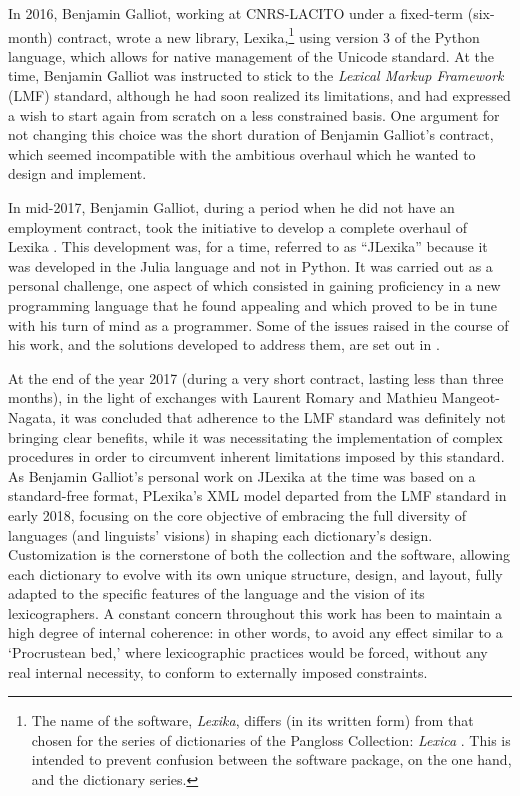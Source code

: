 In 2016, Benjamin Galliot, working at CNRS-LACITO under a fixed-term (six-month) contract, wrote a new library, Lexika,\footnote{The name of the software, \emph{Lexika}, differs (in its written form) from that chosen for the series of dictionaries of the Pangloss Collection: \emph{Lexica} \parencite{lexica2017}. This is intended to prevent confusion between the software package, on the one hand, and the dictionary series.} using version 3 of the Python language, which allows for native management of the Unicode standard. At the time, Benjamin Galliot was instructed to stick to the \emph{Lexical Markup Framework} (LMF) standard, although he had soon realized its limitations, and had expressed a wish to start again from scratch on a less constrained basis. One argument for not changing this choice was the short duration of Benjamin Galliot's contract, which seemed incompatible with the ambitious overhaul which he wanted to design and implement.

In mid-2017, Benjamin Galliot, during a period when he did not have an employment contract, took the initiative to develop a complete overhaul of Lexika \parencite{galliot:2017:lexika}. This development was, for a time, referred to as “JLexika” because it was developed in the Julia language and not in Python. It was carried out as a personal challenge, one aspect of which consisted in gaining proficiency in a new programming language that he found appealing and which proved to be in tune with his turn of mind as a programmer. Some of the issues raised in the course of his work, and the solutions developed to address them, are set out in \cite{galliot:2023:lexikaproblématiques}.

At the end of the year 2017 (during a very short contract, lasting less than three months), in the light of exchanges with Laurent Romary and Mathieu Mangeot-Nagata, it was concluded that adherence to the LMF standard was definitely not bringing clear benefits, while it was necessitating the implementation of complex procedures in order to circumvent inherent limitations imposed by this standard. As Benjamin Galliot's personal work on JLexika at the time was based on a standard-free format, PLexika's XML model departed from the LMF standard in early 2018, focusing on the core objective of embracing the full diversity of languages (and linguists' visions) in shaping each dictionary’s design. Customization is the cornerstone of both the collection and the software, allowing each dictionary to evolve with its own unique structure, design, and layout, fully adapted to the specific features of the language and the vision of its lexicographers. A constant concern throughout this work has been to maintain a high degree of internal coherence: in other words, to avoid any effect similar to a ‘Procrustean bed,’ where lexicographic practices would be forced, without any real internal necessity, to conform to externally imposed constraints.

